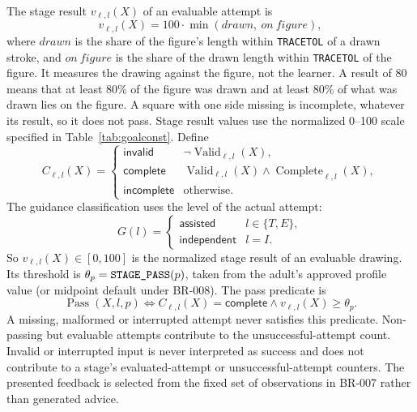 \documentclass[12pt]{article}
\renewcommand{\_}{\textunderscore\allowbreak}%
\begin{document}
The stage result $v_{\ell,l}(X)$ of an evaluable attempt is
\[
v_{\ell,l}(X)=100\cdot\min(\mathit{drawn},\ \mathit{on\ figure}),
\]
where $\mathit{drawn}$ is the share of the figure's length within
\texttt{TRACE\_\allowbreak TOL} of a drawn stroke, and $\mathit{on\ figure}$ is
the share of the drawn length within \texttt{TRACE\_\allowbreak TOL} of the
figure. It measures the drawing against the figure, not the learner. A result
of 80 means that at least 80\% of the figure was drawn and at least 80\% of what
was drawn lies on the figure. A square with one side missing is incomplete,
whatever its result, so it does not pass.
Stage result values use the normalized 0--100 scale specified in
Table~\ref{tab:goalconst}. Define
\[
C_{\ell,l}(X)=
\begin{cases}
\textsf{invalid} & \neg\operatorname{Valid}_{\ell,l}(X),\\
\textsf{complete} & \operatorname{Valid}_{\ell,l}(X)\land
                      \operatorname{Complete}_{\ell,l}(X),\\
\textsf{incomplete} & \text{otherwise}.
\end{cases}
\]
The guidance classification uses the level of the actual attempt:
\[
G(l)=\begin{cases}
\textsf{assisted} & l\in\{T,E\},\\
\textsf{independent} & l=I.
\end{cases}
\]
So $v_{\ell,l}(X)\in[0,100]$ is the normalized stage result of an evaluable
drawing. Its threshold is $\theta_p=\texttt{STAGE\_\allowbreak PASS}(p)$, taken
from the adult's approved profile value (or midpoint default under BR-008). The
pass predicate is
\[
\operatorname{Pass}(X,l,p)\iff
C_{\ell,l}(X)=\textsf{complete}
\land v_{\ell,l}(X)\ge\theta_p.
\]
A missing, malformed or interrupted attempt never satisfies this predicate.
Non-passing but evaluable attempts contribute to the unsuccessful-attempt count.
Invalid or interrupted input is never interpreted as success and does not
contribute to a stage's evaluated-attempt or unsuccessful-attempt counters. The
presented feedback is selected from the fixed set of observations in BR-007
rather than generated advice.
\end{document}
